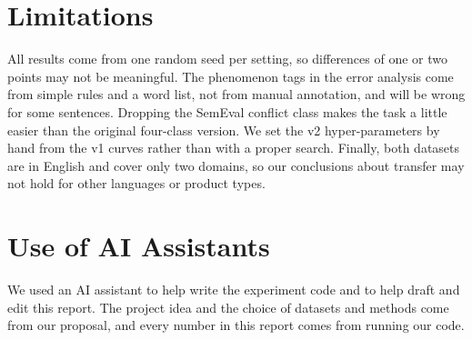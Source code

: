 \documentclass[11pt]{article}
\begin{document}
\section*{Limitations}
All results come from one random seed per setting, so differences of one or two points may not be meaningful. The phenomenon tags in the error analysis come from simple rules and a word list, not from manual annotation, and will be wrong for some sentences. Dropping the SemEval conflict class makes the task a little easier than the original four-class version. We set the v2 hyper-parameters by hand from the v1 curves rather than with a proper search. Finally, both datasets are in English and cover only two domains, so our conclusions about transfer may not hold for other languages or product types.

\section*{Use of AI Assistants}
We used an AI assistant to help write the experiment code and to help draft and edit this report. The project idea and the choice of datasets and methods come from our proposal, and every number in this report comes from running our code.
\end{document}
